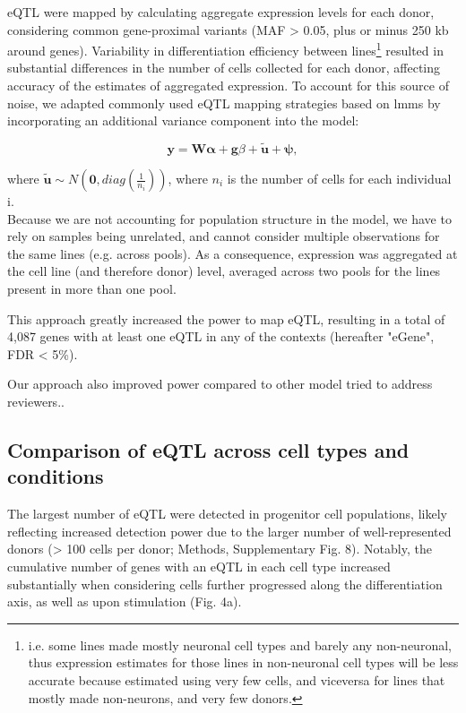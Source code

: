 eQTL were mapped by calculating aggregate expression levels for each donor, considering common gene-proximal variants (MAF > 0.05, plus or minus 250 kb around genes). 
Variability in differentiation efficiency between lines\footnote{i.e. some lines made mostly neuronal cell types and barely any non-neuronal, thus expression estimates for those lines in non-neuronal cell types will be less accurate because estimated using very few cells, and viceversa for lines that mostly made non-neurons, and very few donors.} resulted in substantial differences in the number of cells collected for each donor, affecting accuracy of the estimates of aggregated expression. 
To account for this source of noise, we adapted commonly used eQTL mapping strategies \cite{cuomo2020single} based on \glspl{lmm} by incorporating an additional variance component into the model:

\begin{equation}
    \mathbf{y} = \mathbf{W}\boldsymbol{\alpha} + \mathbf{g}\beta + \tilde{\mathbf{u}} + \boldsymbol{\psi}, 
\end{equation}

where $\tilde{\mathbf{u}} \sim N(\mathbf{0}, diag(\frac{1}{n_i}))$, where $n_i$ is the number of cells for each individual i.\\

Because we are not accounting for population structure in the model, we have to rely on samples being unrelated, and cannot consider multiple observations for the same lines (e.g. across pools). 
As a consequence, expression was aggregated at the cell line (and therefore donor) level, averaged across two pools for the lines present in more than one pool.

This approach greatly increased the power to map eQTL, resulting in a total of 4,087 genes with at least one eQTL in any of the contexts (hereafter "eGene", FDR < 5\%).

Our approach also improved power compared to other model tried to address reviewers..

\subsection{Comparison of eQTL across cell types and conditions}

The largest number of eQTL were detected in progenitor cell populations, likely reflecting increased detection power due to the larger number of well-represented donors (> 100 cells per donor; Methods, Supplementary Fig. 8). 
Notably, the cumulative number of genes with an eQTL in each cell type increased substantially when considering cells further progressed along the differentiation axis, as well as upon stimulation (Fig. 4a). 


